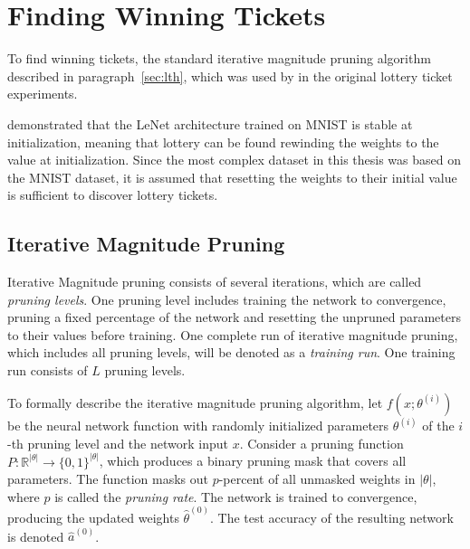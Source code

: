 


\section{Finding Winning Tickets}
To find winning tickets, the standard iterative magnitude pruning algorithm described in paragraph~\ref{sec:lth}, which was used by \textcite{LTH} in the original lottery ticket experiments.

\textcite{LinearModeConnectivity} demonstrated that the LeNet architecture trained on MNIST is stable at initialization, meaning that lottery can be found rewinding the weights to the value at initialization. 
Since the most complex dataset in this thesis was based on the MNIST dataset, it is assumed that resetting the weights to their initial value is sufficient to discover lottery tickets.
\subsection{Iterative Magnitude Pruning}
Iterative Magnitude pruning consists of several iterations, which are called  \textit{pruning levels}.
One pruning level includes training the network to convergence, pruning a fixed percentage of the network and resetting the unpruned parameters to their values before training.
One complete run of iterative magnitude pruning, which includes all pruning levels, will be denoted as a \textit{training run}.
One training run consists of $L$ pruning levels.

To formally describe the iterative magnitude pruning algorithm, let $f(x; \theta^{(i)})$ be the neural network function with randomly initialized parameters $\theta^{(i)}$ of the $i$-th pruning level and the network input $x$.
Consider a pruning function $\textit{P}: \mathbb{R}^{|\theta|} \to {\{0,1\}}^{|\theta|}$, which produces a binary pruning mask that covers all parameters.
The function masks out $p$-percent of all unmasked weights in $|\theta|$, where $p$ is called the \textit{pruning rate}.
The network is trained to convergence, producing the updated weights $\hat \theta^{(0)}$.
The test accuracy of the resulting network is denoted $\hat a^{(0)}$.

